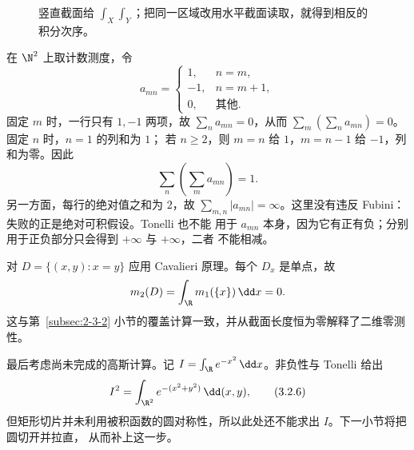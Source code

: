 \begin{figure}[htbp]
\centering
{}
\caption{竖直截面给 $\int_X\int_Y$；把同一区域改用水平截面读取，就得到相反的积分次序。}
\label{fig:3-2-1-slices}
\end{figure}

\begin{example}[换序为何会改变答案]\label{ex:3-2-1-3}
在 $\N^2$ 上取计数测度，令
\[
 a_{mn}=\begin{cases}
 1,&n=m,\\
 -1,&n=m+1,\\
 0,&\text{其他}.
 \end{cases}
\]
固定 $m$ 时，一行只有 $1,-1$ 两项，故
$\sum_n a_{mn}=0$，从而 $\sum_m(\sum_na_{mn})=0$。固定 $n$ 时，$n=1$ 的列和为 $1$；
若 $n\ge2$，则 $m=n$ 给 $1$，$m=n-1$ 给 $-1$，列和为零。因此
\[
 \sum_n\left(\sum_ma_{mn}\right)=1.
\]
另一方面，每行的绝对值之和为 $2$，故
$\sum_{m,n}|a_{mn}|=\infty$。这里没有违反 Fubini：失败的正是绝对可积假设。Tonelli 也不能
用于 $a_{mn}$ 本身，因为它有正有负；分别用于正负部分只会得到 $+\infty$ 与 $+\infty$，二者
不能相减。
\end{example}

\begin{example}[对角线的截面计算]\label{ex:3-2-1-diagonal-recheck}
对 $D=\{(x,y):x=y\}$ 应用 Cavalieri 原理。每个 $D_x$ 是单点，故
\[
 m_2(D)=\int_\R m_1(\{x\})\,\dd x=0.
\]
这与第~\ref{subsec:2-3-2} 小节的覆盖计算一致，并从截面长度恒为零解释了二维零测性。
\end{example}

最后考虑尚未完成的高斯计算。记
$I=\int_\R e^{-x^2}\,\dd x$。非负性与 Tonelli 给出
\[
 I^2=\int_{\R^2}e^{-(x^2+y^2)}\,\dd(x,y),
 \tag{3.2.6}\label{eq:gaussian-tonelli-gap}
\]
但矩形切片并未利用被积函数的圆对称性，所以此处还不能求出 $I$。下一小节将把圆切开并拉直，
从而补上这一步。

